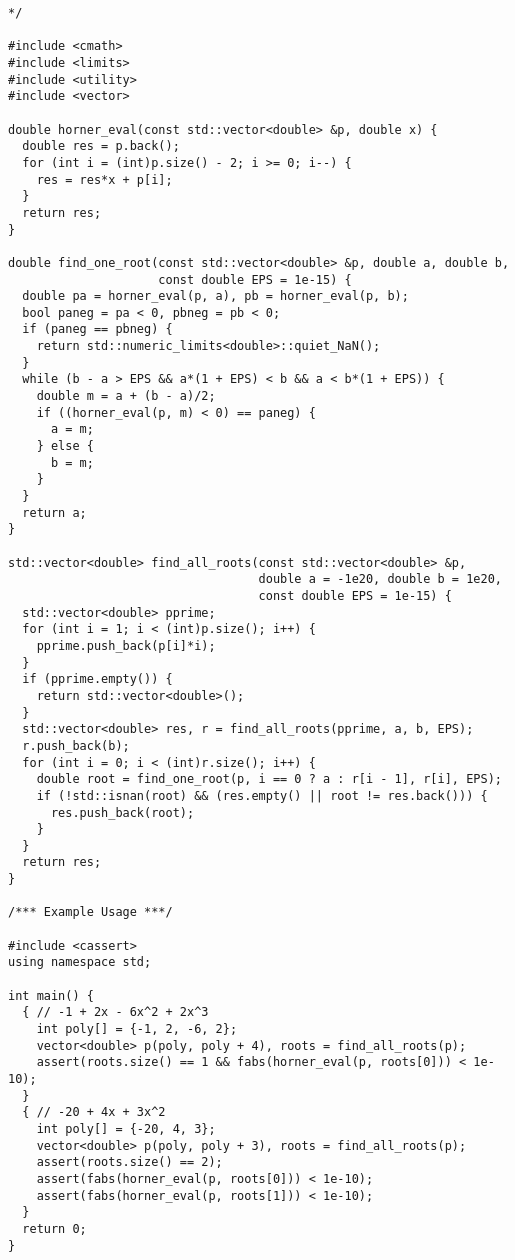 \begin{lstlisting}
*/

#include <cmath>
#include <limits>
#include <utility>
#include <vector>

double horner_eval(const std::vector<double> &p, double x) {
  double res = p.back();
  for (int i = (int)p.size() - 2; i >= 0; i--) {
    res = res*x + p[i];
  }
  return res;
}

double find_one_root(const std::vector<double> &p, double a, double b,
                     const double EPS = 1e-15) {
  double pa = horner_eval(p, a), pb = horner_eval(p, b);
  bool paneg = pa < 0, pbneg = pb < 0;
  if (paneg == pbneg) {
    return std::numeric_limits<double>::quiet_NaN();
  }
  while (b - a > EPS && a*(1 + EPS) < b && a < b*(1 + EPS)) {
    double m = a + (b - a)/2;
    if ((horner_eval(p, m) < 0) == paneg) {
      a = m;
    } else {
      b = m;
    }
  }
  return a;
}

std::vector<double> find_all_roots(const std::vector<double> &p,
                                   double a = -1e20, double b = 1e20,
                                   const double EPS = 1e-15) {
  std::vector<double> pprime;
  for (int i = 1; i < (int)p.size(); i++) {
    pprime.push_back(p[i]*i);
  }
  if (pprime.empty()) {
    return std::vector<double>();
  }
  std::vector<double> res, r = find_all_roots(pprime, a, b, EPS);
  r.push_back(b);
  for (int i = 0; i < (int)r.size(); i++) {
    double root = find_one_root(p, i == 0 ? a : r[i - 1], r[i], EPS);
    if (!std::isnan(root) && (res.empty() || root != res.back())) {
      res.push_back(root);
    }
  }
  return res;
}

/*** Example Usage ***/

#include <cassert>
using namespace std;

int main() {
  { // -1 + 2x - 6x^2 + 2x^3
    int poly[] = {-1, 2, -6, 2};
    vector<double> p(poly, poly + 4), roots = find_all_roots(p);
    assert(roots.size() == 1 && fabs(horner_eval(p, roots[0])) < 1e-10);
  }
  { // -20 + 4x + 3x^2
    int poly[] = {-20, 4, 3};
    vector<double> p(poly, poly + 3), roots = find_all_roots(p);
    assert(roots.size() == 2);
    assert(fabs(horner_eval(p, roots[0])) < 1e-10);
    assert(fabs(horner_eval(p, roots[1])) < 1e-10);
  }
  return 0;
}
\end{lstlisting}
